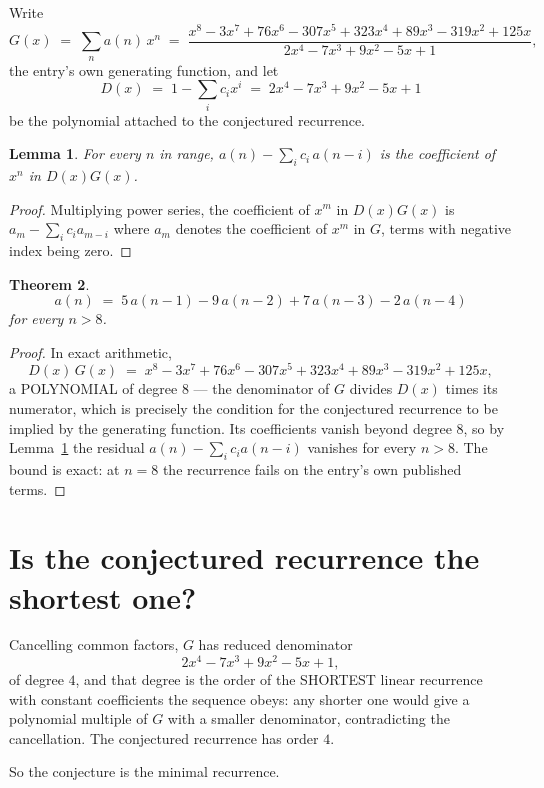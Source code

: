 \documentclass[11pt,a4paper]{article}
\theoremstyle{plain}
\newtheorem{theorem}{Theorem}
\newtheorem{lemma}[theorem]{Lemma}
\theoremstyle{definition}
\begin{document}
Write
\[
G(x)\;=\;\sum_{n}a(n)\,x^{n}\;=\;\frac{x^{8} - 3 x^{7} + 76 x^{6} - 307 x^{5} + 323 x^{4} + 89 x^{3} - 319 x^{2} + 125 x}{2 x^{4} - 7 x^{3} + 9 x^{2} - 5 x + 1},
\]
the entry's own generating function, and let
\[
D(x)\;=\;1-\sum_i c_i x^{i}\;=\;2 x^{4} - 7 x^{3} + 9 x^{2} - 5 x + 1
\]
be the polynomial attached to the conjectured recurrence.

\begin{lemma}\label{lem:key}
For every $n$ in range, $a(n)-\sum_i c_i\,a(n-i)$ is the coefficient of $x^{n}$ in
$D(x)G(x)$.
\end{lemma}

\begin{proof}
Multiplying power series, the coefficient of $x^{m}$ in $D(x)G(x)$ is
$a_m-\sum_i c_i a_{m-i}$ where $a_m$ denotes the coefficient of $x^{m}$ in $G$, terms with
negative index being zero.
\end{proof}

\begin{theorem}
\[
a(n)\;=\;5\,a(n-1) - 9\,a(n-2) + 7\,a(n-3) - 2\,a(n-4)
\]
for every $n>8$.
\end{theorem}

\begin{proof}
In exact arithmetic,
\[
D(x)\,G(x)\;=\;x^{8} - 3 x^{7} + 76 x^{6} - 307 x^{5} + 323 x^{4} + 89 x^{3} - 319 x^{2} + 125 x,
\]
a POLYNOMIAL of degree $8$ --- the denominator of $G$ divides $D(x)$ times its numerator,
which is precisely the condition for the conjectured recurrence to be implied by the
generating function. Its coefficients vanish beyond degree $8$, so by
Lemma~\ref{lem:key} the residual $a(n)-\sum_ic_ia(n-i)$ vanishes for every
$n>8$. The bound is exact: at $n=8$ the recurrence fails on the entry's own published terms.
\end{proof}

\section{Is the conjectured recurrence the shortest one?}

Cancelling common factors, $G$ has reduced denominator
\[
2 x^{4} - 7 x^{3} + 9 x^{2} - 5 x + 1,
\]
of degree $4$, and that degree is the order of the SHORTEST linear recurrence with
constant coefficients the sequence obeys: any shorter one would give a polynomial multiple of
$G$ with a smaller denominator, contradicting the cancellation. The conjectured recurrence has
order $4$.

So the conjecture is the minimal recurrence.
\end{document}
